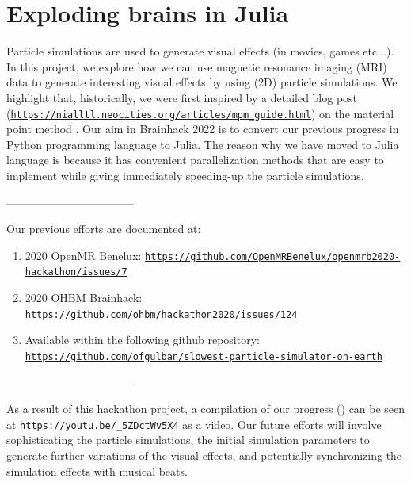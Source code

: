 \documentclass[../main.tex]{subfiles}
\begin{document}
\section{Exploding brains in Julia}



Particle simulations are used to generate visual effects (in movies, games etc...). In this project, we explore how we can use magnetic resonance imaging (MRI) data to generate interesting visual effects by using (2D) particle simulations. We highlight that, historically, we were first inspired by a detailed blog post (\texttt{\url{https://nialltl.neocities.org/articles/mpm_guide.html}}) on the material point method \parencite{Jiang1965, Love2006, Stomakhin2013a}. Our aim in Brainhack 2022 is to convert our previous progress in Python programming language to Julia. The reason why we have moved to Julia language is because it has convenient parallelization methods that are easy to implement while giving immediately speeding-up the particle simulations.

-----------------------------------

Our previous efforts are documented at:
\begin{enumerate}
    \item 2020 OpenMR Benelux: \texttt{\url{https://github.com/OpenMRBenelux/openmrb2020-hackathon/issues/7}} 
    \item 2020 OHBM Brainhack: \texttt{\url{https://github.com/ohbm/hackathon2020/issues/124}}
    \item Available within the following github repository: \texttt{\url{https://github.com/ofgulban/slowest-particle-simulator-on-earth}}    
\end{enumerate}

-----------------------------------

As a result of this hackathon project, a compilation of our progress () can be seen at \texttt{\url{https://youtu.be/_5ZDctWv5X4}} as a video. Our future efforts will involve sophisticating the particle simulations, the initial simulation parameters to generate further variations of the visual effects, and potentially synchronizing the simulation effects with musical beats.
\end{document}
